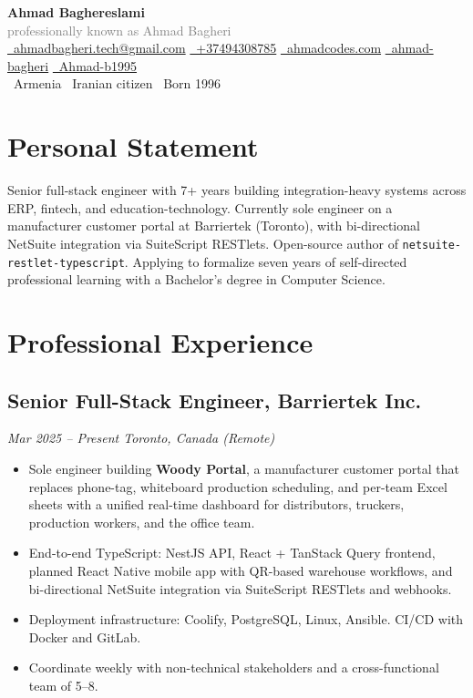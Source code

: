 \documentclass[a4paper,10pt]{article}
\begin{document}
\begin{center}
  {\Huge\bfseries Ahmad Baghereslami}\\[4pt]
  {\footnotesize\textcolor{gray}{professionally known as Ahmad Bagheri}}\\[6pt]
  \footnotesize
  \href{mailto:ahmadbagheri.tech@gmail.com}{\faEnvelope~ahmadbagheri.tech@gmail.com} \quad
  \href{tel:+37494308785}{\faPhone~+37494308785} \quad
  \href{https://ahmadcodes.com}{\faGlobe~ahmadcodes.com} \quad
  \href{https://www.linkedin.com/in/ahmad-bagheri/}{\faLinkedin~ahmad-bagheri} \quad
  \href{https://github.com/Ahmad-b1995}{\faGithub~Ahmad-b1995}\\
  \faMapMarker~Armenia \quad
  \faIdCard~Iranian citizen \quad
  \faCalendar~Born 1996
\end{center}

\section*{Personal Statement}
Senior full-stack engineer with 7+ years building integration-heavy systems across ERP, fintech, and education-technology. Currently sole engineer on a manufacturer customer portal at Barriertek (Toronto), with bi-directional NetSuite integration via SuiteScript RESTlets. Open-source author of \texttt{netsuite-restlet-typescript}. Applying to formalize seven years of self-directed professional learning with a Bachelor's degree in Computer Science.

\section{Professional Experience}

\subsection{Senior Full-Stack Engineer, Barriertek Inc.}
\emph{Mar 2025 -- Present \textbar{} Toronto, Canada (Remote)}
\begin{itemize}[leftmargin=14pt,itemsep=2pt]
  \item Sole engineer building \textbf{Woody Portal}, a manufacturer customer portal that replaces phone-tag, whiteboard production scheduling, and per-team Excel sheets with a unified real-time dashboard for distributors, truckers, production workers, and the office team.
  \item End-to-end TypeScript: NestJS API, React + TanStack Query frontend, planned React Native mobile app with QR-based warehouse workflows, and bi-directional NetSuite integration via SuiteScript RESTlets and webhooks.
  \item Deployment infrastructure: Coolify, PostgreSQL, Linux, Ansible. CI/CD with Docker and GitLab.
  \item Coordinate weekly with non-technical stakeholders and a cross-functional team of 5--8.
\end{itemize}
\end{document}

